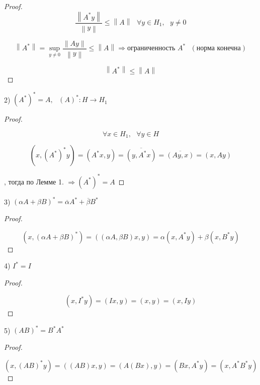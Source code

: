 \documentclass[12pt, a4paper]{report}
\begin{document}
\begin{proof}
\[ \frac{ \left\lVert  A^ * y  \right\rVert}{\left\lVert y  \right\rVert} \le  \left\lVert  A  \right\rVert \text{ } \forall  y \in  H_1 , \text{  }  y\neq 0     \] 

\[ \left\lVert A ^* \right\rVert = \sup _{y \neq 0 }  \frac{\left\lVert  A y  \right\rVert}{\left\lVert y \right\rVert} \le  \left\lVert  A  \right\rVert \Rightarrow \text{ограниченность } A ^* \text{ }  (\text{норма конечна} )   \] 

\[ \left\lVert  A ^*  \right\rVert \le  \left\lVert  A  \right\rVert  \] 

\end{proof}

2) \( (A ^* )^ * = A , \text{ }  (A ) ^* : H \to  H_1 \)  

\begin{proof} \(  \) 

    \[ \forall  x \in  H_1 , \text{ }  \forall  y \in H \] 

    \[ (x , (A ^* ) ^* y ) = (A ^* x , y ) = \overline{(y , A ^* x ) } = \overline{ (A y , x )}  = (x , A y)  \]  

    , тогда по Лемме 1. \( \Rightarrow  (A ^* )^* = A \) 

\end{proof}

3) \( (\alpha A + \beta B ) ^ * = \overline{ \alpha } A ^* + \overline{\beta } B^*      \) 

\begin{proof} \(  \) 

    \[ (x, (\alpha A + \beta B )^* ) =  (( \alpha A , \beta B ) x , y ) = \alpha (x , A^* y ) + \beta ( x , B^* y ) \] 

\end{proof}

4) \( I^*  =I  \) 

\begin{proof} \(  \) 

    \[ (x ,I^* y ) = ( I x , y ) = ( x, y ) = (x , I y) \] 

\end{proof}

5) \( (A B ) ^* = B^* A ^*  \)  

\begin{proof} \(  \) 

    \[ ( x, (A B ) ^ * y ) = ((A B )x , y ) = ( A (B x ) , y ) = (Bx , A ^* y ) = (x , A ^* B ^* y) \]  

\end{proof}
\end{document}
